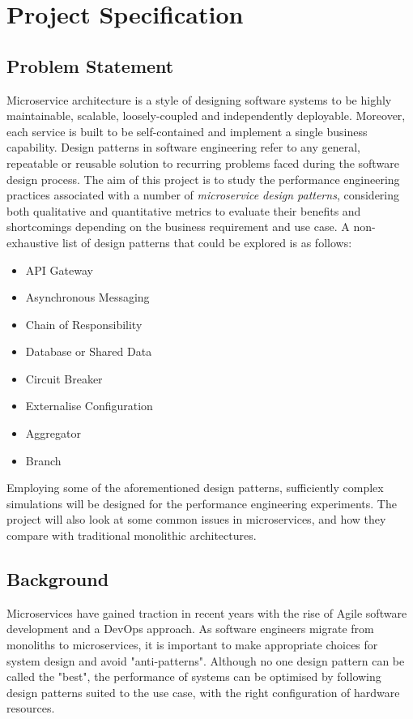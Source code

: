 \chapter{Project Specification}

\section{Problem Statement}
Microservice architecture is a style of designing software systems to be highly maintainable, scalable, 
loosely-coupled and independently deployable. Moreover, each service is built to be self-contained and 
implement a single business capability. Design patterns in software engineering refer to any general, 
repeatable or reusable solution to recurring problems faced during the software design process. The aim 
of this project is to study the performance engineering practices associated with a number of \textit{microservice 
design patterns}, considering both qualitative and quantitative metrics to evaluate their benefits and shortcomings 
depending on the business requirement and use case. A non-exhaustive list of design patterns that could be 
explored is as follows:

\begin{itemize}
	\item API Gateway
	\item Asynchronous Messaging
	\item Chain of Responsibility
	\item Database or Shared Data
	\item Circuit Breaker
	\item Externalise Configuration
	\item Aggregator
	\item Branch
\end{itemize}

Employing some of the aforementioned design patterns, sufficiently complex simulations will be designed for 
the performance engineering experiments. The project will also look at some common issues in microservices, 
and how they compare with traditional monolithic architectures.

\pagebreak
\section{Background}
Microservices have gained traction in recent years with the rise of Agile software development and a DevOps 
\cite{awsDevOps} approach. As software engineers migrate from monoliths to microservices, it is important to 
make appropriate choices for system design and avoid "anti-patterns". Although no one design pattern can be 
called the "best", the performance of systems can be optimised by following design patterns suited to the use 
case, with the right configuration of hardware resources.

